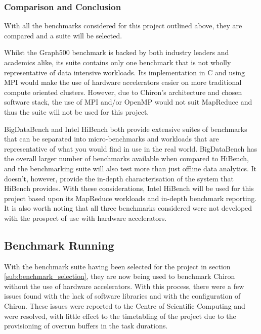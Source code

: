 \documentclass[12pt,a4paper]{article}
\begin{document}
            \subsubsection{Comparison and Conclusion}
            \label{ssub:comparison_and_conclusion}

                With all the benchmarks considered for this project outlined above, they are compared and a suite will be selected.

                Whilst the Graph500 benchmark is backed by both industry leaders and academics alike, its suite contains only one benchmark that is not wholly representative of data intensive workloads. Its implementation in C and using MPI would make the use of hardware accelerators easier on more traditional compute oriented clusters. However, due to Chiron's architecture and chosen software stack, the use of MPI and/or OpenMP would not suit MapReduce and thus the suite will not be used for this project.

                BigDataBench and Intel HiBench both provide extensive suites of benchmarks that can be separated into micro-benchmarks and workloads that are representative of what you would find in use in the real world. BigDataBench has the overall larger number of benchmarks available when compared to HiBench, and the benchmarking suite will also test more than just offline data analytics. It doesn't, however, provide the in-depth characterisation of the system that HiBench provides. With these considerations, Intel HiBench will be used for this project based upon its MapReduce workloads and in-depth benchmark reporting. It is also worth noting that all three benchmarks considered were not developed with the prospect of use with hardware accelerators.
            
        \subsection{Benchmark Running}
        \label{sub:benchmark_running}

            With the benchmark suite having been selected for the project in section \ref{sub:benchmark_selection}, they are now being used to benchmark Chiron without the use of hardware accelerators. With this process, there were a few issues found with the lack of software libraries and with the configuration of Chiron. These issues were reported to the Centre of Scientific Computing and were resolved, with little effect to the timetabling of the project due to the provisioning of overrun buffers in the task durations.
\end{document}
